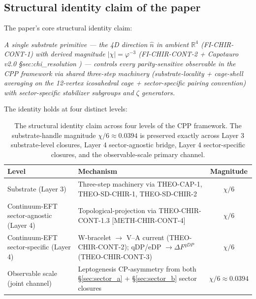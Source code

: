 \documentclass[11pt,letterpaper]{article}
\newcommand{\DeltaFqDP}{\Delta F^{qDP}}
\newcommand{\methref}[1]{\textsf{\small[\textsc{#1}]}}
\begin{document}
\subsection{Structural identity claim of the paper}
\label{sec:structural_identity_claim}

The paper's core structural identity claim:

\begin{mdframed}[backgroundcolor=blue!5,linewidth=0.5pt,leftline=true,rightline=true]
\emph{A single substrate primitive --- the 4D direction $\hat{n}$ in ambient $\mathbb{R}^4$ (FI-CHIR-CONT-1) with derived magnitude $|\chi| = \varphi^{-3}$ (FI-CHIR-CONT-2 + Capotauro v2.0 §sec:chi\_resolution \cite{Capotauro}) --- controls every parity-sensitive observable in the CPP framework via shared three-step machinery (substrate-locality + cage-shell averaging on the 12-vertex icosahedral cage + sector-specific pairing convention) with sector-specific stabilizer subgroups and $\zeta$ generators.}
\end{mdframed}

The identity holds at four distinct levels:

\begin{table}[h!]
\caption{The structural identity claim across four levels of the CPP framework. The substrate-handle magnitude $\chi/6 \approx 0.0394$ is preserved exactly across Layer 3 substrate-level closures, Layer 4 sector-agnostic bridge, Layer 4 sector-specific closures, and the observable-scale primary channel.}
\label{tab:identity_four_levels}
\begin{center}
\small
\begin{tabular}{lp{4.5cm}c}
\toprule
\textbf{Level} & \textbf{Mechanism} & \textbf{Magnitude} \\
\midrule
Substrate (Layer 3) & Three-step machinery via THEO-CAP-1, THEO-SD-CHIR-1, THEO-SD-CHIR-2 & $\chi/6$ \\
Continuum-EFT sector-agnostic (Layer 4) & Topological-projection via THEO-CHIR-CONT-1.3 \methref{METH-CHIR-CONT-4} & $\chi/6$ \\
Continuum-EFT sector-specific (Layer 4) & W-bracelet $\to$ V--A current (THEO-CHIR-CONT-2); qDP/eDP $\to \DeltaFqDP$ (THEO-CHIR-CONT-3) & $\chi/6$ \\
Observable scale (joint channel) & Leptogenesis CP-asymmetry from both §\ref{sec:sector_a} + §\ref{sec:sector_b} sector closures & $\chi/6 \approx 0.0394$ \\
\bottomrule
\end{tabular}
\end{center}
\end{table}
\end{document}
